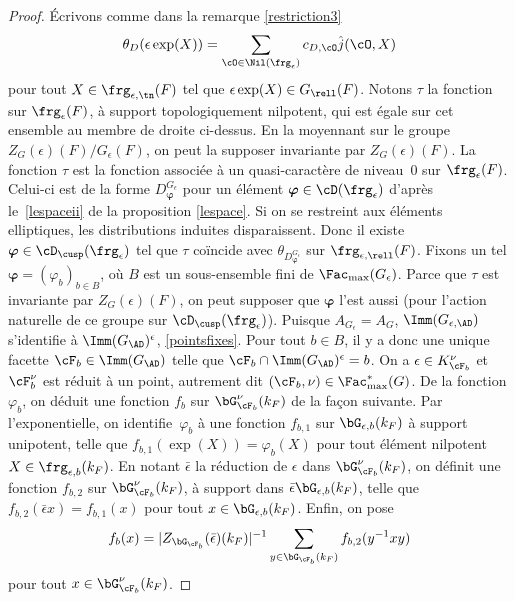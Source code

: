 \begin{proof}
Écrivons comme dans la remarque \eqref{restriction3}
\[
\theta_{D}(\epsilon \exp(X))=\sum_{\cO\in \Nil(\frg_{\epsilon})}c_{D,\cO}\hat{j}(\cO,X)
\]
pour tout $X\in \frg_{\epsilon,\tn}(F)$ tel que $\epsilon \exp(X)\in G_{\rell}(F)$.
Notons $\tau$ la fonction sur $\frg_{\epsilon}(F)$, à support topologiquement nilpotent, qui est égale sur cet ensemble au membre de droite ci-dessus. En la moyennant sur le groupe $Z_{G}(\epsilon)(F)/G_{\epsilon}(F)$, on peut la supposer invariante par $Z_{G}(\epsilon)(F)$. La fonction $\tau$ est
la fonction associée à un quasi-caractère de niveau~$0$ sur $\frg_{\epsilon}(F)$. Celui-ci est de la forme $D^{G_{\epsilon}}_{\boldsymbol{\varphi}}$ pour un élément $\boldsymbol{\varphi}\in \cD(\frg_{\epsilon})$ d'après le~\eqref{lespaceii} de la proposition \ref{lespace}. Si on se restreint aux éléments elliptiques, les distributions induites disparaissent. Donc il existe $\boldsymbol{\varphi}\in \cD_{\cusp}(\frg_{\epsilon})$ tel que $\tau$ coïncide avec $\theta_{D^{G_{\epsilon}}_{\boldsymbol{\varphi}}}$ sur $\frg_{\epsilon,\rell}(F)$. Fixons un tel $\boldsymbol{\varphi}=(\varphi_{b})_{b\in B}$, où $B$ est un sous-ensemble fini de $\Fac_{\max}(G_{\epsilon})$. Parce que $\tau$ est invariante par $Z_{G}(\epsilon)(F)$, on peut supposer que $\boldsymbol{\varphi}$ l'est aussi (pour l'action naturelle de ce groupe sur $\cD_{\cusp}(\frg_{\epsilon})$).
Puisque $A_{G_{\epsilon}}=A_{G}$, $\Imm(G_{\epsilon,\AD})$ s'identifie à $\Imm(G_{\AD})^{\epsilon}$, \cf \ref{pointsfixes}. Pour tout $b\in B$, il y a donc une unique facette $\cF_{b}\in \Imm(G_{\AD})$ telle que $\cF_{b}\cap \Imm(G_{\AD})^{\epsilon}=b$. On a $\epsilon\in K_{\cF_{b}}^{\nu}$ et $\cF_{b}^{\nu}$ est réduit à un point, autrement dit $(\cF_{b},\nu)\in \Fac^*_{\max}(G)$. De la fonction $\varphi_{b}$, on déduit une fonction $f_{b}$ sur $\bG_{\cF_{b}}^{\nu}(k_{F})$ de la façon suivante. Par l'exponentielle, on identifie~$\varphi_{b}$ à une fonction $f_{b,1}$ sur $\bG_{\epsilon,b}(k_{F})$ à support unipotent, telle que $f_{b,1}(\exp(X))=\varphi_{b}(X)$ pour tout élément nilpotent $X\in \boldsymbol{\frg}_{\epsilon,b}(k_{F})$. En notant $\bar{\epsilon}$ la réduction de $\epsilon$ dans $\bG_{\cF_{b}}^{\nu}(k_{F})$, on définit une fonction $f_{b,2}$ sur $\bG_{\cF_{b}}^{\nu}(k_{F})$, à support dans $\bar{\epsilon}\bG_{\epsilon,b}(k_{F})$, telle que $f_{b,2}(\bar{\epsilon}x)=f_{b,1}(x)$ pour tout $x\in \bG_{\epsilon,b}(k_{F})$. Enfin, on pose
\[
f_{b}(x)=\vert Z_{\bG_{\cF_{b}}}(\bar{\epsilon})(k_{F})\vert ^{-1}
\sum_{y\in \bG_{\cF_{b}}(k_{F})}f_{b,2}(y^{-1}xy)
\]
pour tout $x\in \bG_{\cF_{b}}^{\nu}(k_{F})$.


\end{proof}
